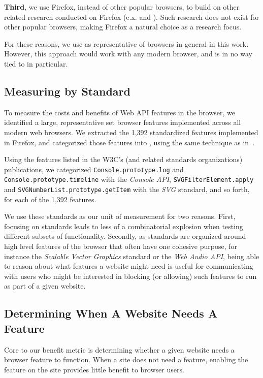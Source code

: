 \textbf{Third}, we use Firefox, instead of other popular browsers, to build on
other related research conducted on Firefox (e.x. \cite{snyder2016browser} and
\cite{shin2011evaluating}).  Such research does not exist for other popular
browsers, making Firefox a natural choice as a research focus.

For these reasons, we use \FFWithVersion as representative of browsers in
general in this work.  However, this approach would work with any modern browser,
and is in no way tied to  \FFWithVersion in particular.


\subsection{Measuring by Standard}
To measure the costs and benefits of Web API features in the browser, we identified
a large, representative set browser features implemented across
all modern web browsers.  We extracted the 1,392 standardized \WAPI features
implemented in Firefox, and categorized those features into
\NumStandards \WASs, using the same technique as in~\cite{snyder2016browser}.

Using the features listed in the W3C's
(and related standards organizations) publications, we categorized \texttt{Console.prototype.log}
and \texttt{Console.prototype.timeline} with the \emph{Console API},
\texttt{SVGFilterElement.apply} and \texttt{SVGNumberList.prototype.getItem} with
the \emph{SVG} standard, and so forth, for each of the 1,392 features.

We use these \NumStandards standards as our unit of \WAPI measurement for two
reasons.  First, focusing on \NumStandards standards leads to less of a combinatorial explosion when
testing different subsets of \WAPI functionality.  Secondly, as
standards are organized around high level features of the browser that often
have one cohesive purpose, for instance the \emph{Scalable Vector Graphics} standard or the \emph{Web
Audio API}, being able to reason about what features a website might need is
useful for communicating with users who
might be interested in blocking (or allowing) such features to run as part of a
given website.

\subsection{Determining When A Website Needs A Feature}
\label{cost-benefit:methodology:manual-inspection}

Core to our benefit metric is determining whether a given website
needs a browser feature to function.  When a site does not need a feature,
enabling the feature on the site provides little benefit to browser users.

